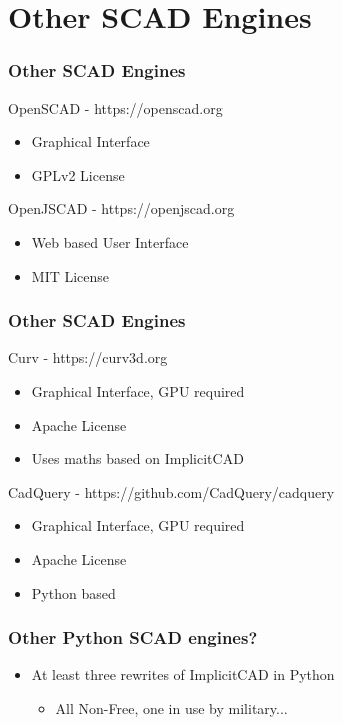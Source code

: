 \documentclass{beamer}
\begin{document}
\section{Other SCAD Engines}
\begin{frame}
\frametitle{Other SCAD Engines}
\begin{block}{OpenSCAD - https://openscad.org}
\begin{itemize}
\item Graphical Interface
\item GPLv2 License
\end{itemize}
\end{block}
\begin{block}{OpenJSCAD - https://openjscad.org}
\begin{itemize}
\item Web based User Interface
\item MIT License
\end{itemize}
\end{block}
\end{frame}

\begin{frame}
\frametitle{Other SCAD Engines}
\begin{block}{Curv - https://curv3d.org}
\begin{itemize}
\item Graphical Interface, GPU required
\item Apache License
\item Uses maths based on ImplicitCAD
\end{itemize}
\end{block}
\begin{block}{CadQuery - https://github.com/CadQuery/cadquery}
\begin{itemize}
\item Graphical Interface, GPU required
\item Apache License
\item Python based
\end{itemize}
\end{block}
\end{frame}

\begin{frame}
\frametitle{Other Python SCAD engines?}
\begin{itemize}
\item At least three rewrites of ImplicitCAD in Python
\begin{itemize}
\item All Non-Free, one in use by military...
\end{itemize}
\end{itemize}
\end{frame}
\end{document}

